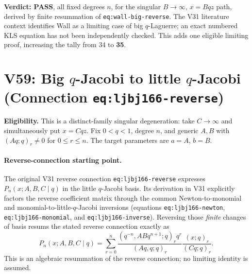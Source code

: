 \documentclass[11pt]{article}
\begin{document}
\noindent\textbf{Verdict: PASS}, all fixed degrees $n$, for the singular $B\to\infty$, $x=Bqz$ path, derived by finite resummation of \texttt{eq:wall-big-reverse}. The V31 literature context identifies Wall as a limiting case of big $q$-Laguerre; an exact numbered KLS equation has not been independently checked. This adds one eligible limiting proof, increasing the tally from 34 to \textbf{35}.


\section{V59: Big $q$-Jacobi to little $q$-Jacobi (Connection \texttt{eq:ljbj166-reverse})}
\noindent\textbf{Eligibility.} This is a distinct-family singular degeneration: take $C\to\infty$ and simultaneously put $x=Cqz$. Fix $0<q<1$, degree $n$, and generic $A,B$ with $(Aq;q)_r\ne0$ for $0\le r\le n$. The target parameters are $a=A$, $b=B$.

\paragraph{Reverse-connection starting point.}
The original V31 reverse connection \texttt{eq:ljbj166-reverse} expresses $P_n(x;A,B,C\mid q)$ in the little $q$-Jacobi basis. Its derivation in V31 explicitly factors the reverse coefficient matrix through the common Newton-to-monomial and monomial-to-little-$q$-Jacobi inversions (equations \texttt{eq:ljbj166-newton}, \texttt{eq:ljbj166-monomial}, and \texttt{eq:ljbj166-inverse}). Reversing those \emph{finite} changes of basis resums the stated reverse connection exactly as
\begin{equation}\label{eq:v59-resum}
 P_n(x;A,B,C\mid q)=\sum_{r=0}^{n}
 \frac{(q^{-n},ABq^{n+1};q)_r q^r}{(Aq,q;q)_r}
 \frac{(x;q)_r}{(Cq;q)_r}.
\end{equation}
This is an algebraic resummation of the reverse connection; no limiting identity is assumed.
\end{document}
